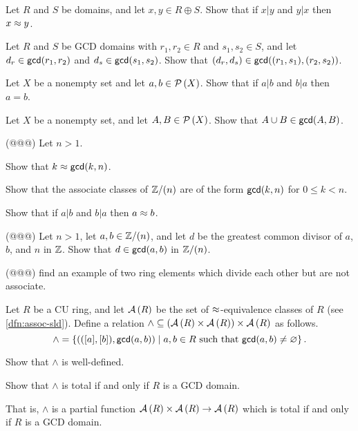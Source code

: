 \Exercises%

\begin{exercise}
Let $R$ and $S$ be domains, and let $x,y \in R \oplus S$. Show that if $x|y$ and $y|x$ then $x \approx y$.
\end{exercise}

\begin{exercise}
Let $R$ and $S$ be GCD domains with $r_1,r_2 \in R$ and $s_1,s_2 \in S$, and let $d_r \in \mathsf{gcd}(r_1, r_2)$ and $d_s \in \mathsf{gcd}(s_1, s_2)$. Show that $(d_r, d_s) \in \mathsf{gcd}((r_1,s_1), (r_2,s_2))$.
\end{exercise}

\begin{exercise}
Let $X$ be a nonempty set and let $a,b \in \mathcal{P}\left(X\right)$. Show that if $a|b$ and $b|a$ then $a = b$.
\end{exercise}

\begin{exercise}
Let $X$ be a nonempty set, and let $A, B \in \mathcal{P}\left(X\right)$. Show that $A \cup B \in \mathsf{gcd}(A, B)$.
\end{exercise}

\begin{exercise}
(@@@) Let $n > 1$.
\begin{proplist*}
\item Show that $k \approx \mathsf{gcd}(k, n)$.
\item Show that the associate classes of $\mathbb{Z}/(n)$ are of the form $\mathsf{gcd}(k, n)$ for $0 \leq k < n$.
\item Show that if $a|b$ and $b|a$ then $a \approx b$.
\end{proplist*}
\end{exercise}

\begin{exercise}
(@@@) Let $n > 1$, let $a,b \in \mathbb{Z}/(n)$, and let $d$ be the greatest common divisor of $a$, $b$, and $n$ in $\mathbb{Z}$. Show that $d \in \mathsf{gcd}(a, b)$ in $\mathbb{Z}/(n)$.
\end{exercise}

\begin{exercise}
(@@@) find an example of two ring elements which divide each other but are not associate.
\end{exercise}

\begin{exercise} \label{exerc:gcd-meet}
Let \(R\) be a CU ring, and let \( \mathcal{A}\left(R\right) \) be the set of \(\approx\)-equivalence classes of \(R\) (see \ref{dfn:assoc-sld}). Define a relation \(\wedge \subseteq ( \mathcal{A}\left(R\right)  \times  \mathcal{A}\left(R\right) ) \times  \mathcal{A}\left(R\right) \) as follows. \[ \wedge = \left\{ \left(([a],[b]), \mathsf{gcd}(a, b)\right) \mid a,b \in R\ \mathrm{such\ that}\ \mathsf{gcd}(a, b) \neq \varnothing \right\}. \]
\begin{proplist}
\item Show that \(\wedge\) is well-defined.
\item Show that \(\wedge\) is total if and only if \(R\) is a GCD domain.
\end{proplist}
That is, \(\wedge\) is a partial function \( \mathcal{A}\left(R\right)  \times  \mathcal{A}\left(R\right)  \rightarrow  \mathcal{A}\left(R\right) \) which is total if and only if \(R\) is a GCD domain.
\end{exercise}

